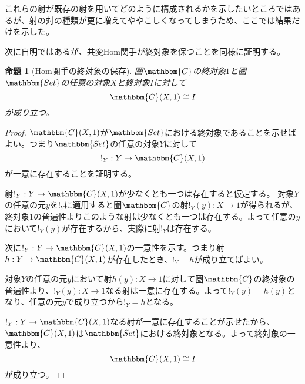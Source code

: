 \documentclass[uplatex,dvipdfmx]{jsarticle}
\newcommand{\cat}[1]{\mathbbm{#1}}
\newcommand{\arrow}{\rightarrow}
\newcommand{\mor}[3]{#1:#2\arrow #3}
\newcommand{\arset}[3]{\cat{#1}(#2,#3)}
\newtheorem{proof}{証明}[section]
\newtheorem{prop}{命題}[section]
\numberwithin{proof}{subsection}
\numberwithin{prop}{subsection}
\numberwithin{define}{subsection}
\begin{document}
  これらの射が既存の射を用いてどのように構成されるかを示したいところではあるが、射の対の種類が更に増えてややこしくなってしまうため、ここでは結果だけを示した。

	次に自明ではあるが、共変Hom関手が終対象を保つことを同様に証明する。
	\begin{prop}[Hom関手の終対象の保存]
		圏$\cat{C}$の終対象$1$と圏$\cat{Set}$の任意の対象$X$と終対象$I$に対して\[\arset{C}{X}{1}\cong I\]が成り立つ。
	\end{prop}
	\begin{proof}
		$\arset{C}{X}{1}$が$\cat{Set}$における終対象であることを示せばよい。つまり$\cat{Set}$の任意の対象$Y$に対して\[\mor{!_Y}{Y}{\arset{C}{X}{1}}\]が一意に存在することを証明する。

		射$\mor{!_Y}{Y}{\arset{C}{X}{1}}$が少なくとも一つは存在すると仮定する。
		対象$Y$の任意の元$y$を$!_Y$に適用すると圏$\cat{C}$の射$\mor{!_Y(y)}{X}{1}$が得られるが、終対象$1$の普遍性よりこのような射は少なくとも一つは存在する。よって任意の$y$において$!_Y(y)$が存在するから、実際に射$!_Y$は存在する。
		\begin{center}
		\end{center}
		次に$\mor{!_Y}{Y}{\arset{C}{X}{1}}$の一意性を示す。つまり射$\mor{h}{Y}{\arset{C}{X}{1}}$が存在したとき、$!_Y=h$が成り立てばよい。

		対象$Y$の任意の元$y$において射$\mor{h(y)}{X}{1}$に対して圏$\cat{C}$の終対象の普遍性より、$\mor{!_Y(y)}{X}{1}$なる射は一意に存在する。よって$!_Y(y)=h(y)$となり、任意の元$y$で成り立つから$!_Y=h$となる。

		\begin{center}
		\end{center}
		$\mor{!_Y}{Y}{\arset{C}{X}{1}}$なる射が一意に存在することが示せたから、$\arset{C}{X}{1}$は$\cat{Set}$における終対象となる。よって終対象の一意性より、\[\arset{C}{X}{1}\cong I\]が成り立つ。
	\end{proof}
\end{document}
